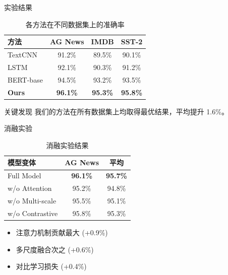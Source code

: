\documentclass[aspectratio=169]{beamer}
\begin{document}
\begin{frame}{实验结果}
  \begin{table}
    \centering
    \begin{tabular}{lccc}
      \toprule
      方法 & AG News & IMDB & SST-2 \\
      \midrule
      TextCNN & 91.2\% & 89.5\% & 90.1\% \\
      LSTM & 92.1\% & 90.3\% & 91.2\% \\
      BERT-base & 94.5\% & 93.2\% & 93.5\% \\
      \textbf{Ours} & \textbf{96.1\%} & \textbf{95.3\%} & \textbf{95.8\%} \\
      \bottomrule
    \end{tabular}
    \caption{各方法在不同数据集上的准确率}
  \end{table}

  \vspace{0.5em}
  \begin{alertblock}{关键发现}
    我们的方法在所有数据集上均取得最优结果，平均提升 1.6\%。
  \end{alertblock}
\end{frame}

\begin{frame}{消融实验}
  \begin{table}
    \centering
    \begin{tabular}{lcc}
      \toprule
      模型变体 & AG News & 平均 \\
      \midrule
      Full Model & \textbf{96.1\%} & \textbf{95.7\%} \\
      w/o Attention & 95.2\% & 94.8\% \\
      w/o Multi-scale & 95.5\% & 95.1\% \\
      w/o Contrastive & 95.8\% & 95.3\% \\
      \bottomrule
    \end{tabular}
    \caption{消融实验结果}
  \end{table}

  \vspace{0.5em}
  \begin{itemize}
    \item 注意力机制贡献最大 (+0.9\%)
    \item 多尺度融合次之 (+0.6\%)
    \item 对比学习损失 (+0.4\%)
  \end{itemize}
\end{frame}
\end{document}
